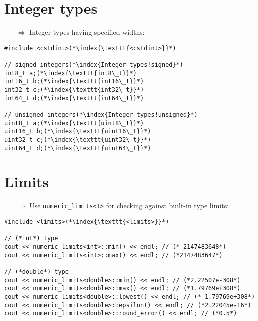 \documentclass[10pt]{article}
\begin{document}
\section{Integer types}
\small
\begin{enumerate}
\item[$\Rightarrow$] Integer types having specified widths:
\end{enumerate}
\begin{lstlisting}
#include <cstdint>(*\index{\texttt{<cstdint>}}*)

// signed integers(*\index{Integer types!signed}*)
int8_t a;(*\index{\texttt{int8\_t}}*)
int16_t b;(*\index{\texttt{int16\_t}}*)
int32_t c;(*\index{\texttt{int32\_t}}*)
int64_t d;(*\index{\texttt{int64\_t}}*)

// unsigned integers(*\index{Integer types!unsigned}*)
uint8_t a;(*\index{\texttt{uint8\_t}}*)
uint16_t b;(*\index{\texttt{uint16\_t}}*)
uint32_t c;(*\index{\texttt{uint32\_t}}*)
uint64_t d;(*\index{\texttt{uint64\_t}}*)
\end{lstlisting}
%
%
\section{Limits}
\small
\begin{enumerate}
\item[$\Rightarrow$] Use \texttt{numeric\_limits<T>} for checking against built-in type limits:
\end{enumerate}
\begin{lstlisting}
#include <limits>(*\index{\texttt{<limits>}}*)

// (*int*) type
cout << numeric_limits<int>::min() << endl; // (*-2147483648*)
cout << numeric_limits<int>::max() << endl; // (*2147483647*)
    
// (*double*) type
cout << numeric_limits<double>::min() << endl; // (*2.22507e-308*)
cout << numeric_limits<double>::max() << endl; // (*1.79769e+308*)
cout << numeric_limits<double>::lowest() << endl; // (*-1.79769e+308*)
cout << numeric_limits<double>::epsilon() << endl; // (*2.22045e-16*)
cout << numeric_limits<double>::round_error() << endl; // (*0.5*)
\end{lstlisting}
%
%
\end{document}
